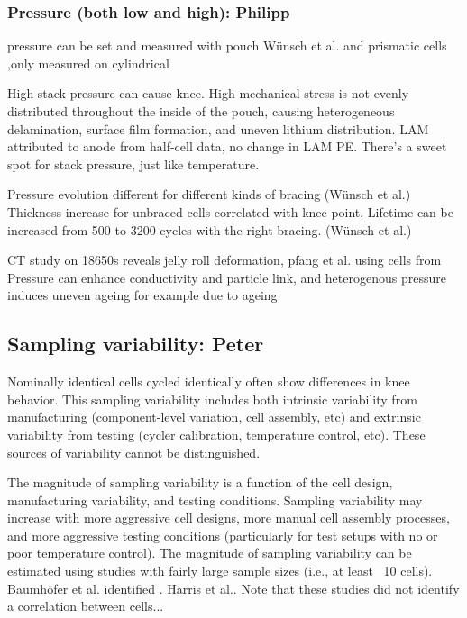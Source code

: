 \documentclass{article}
\begin{document}
\subsubsection{Pressure (both low and high): Philipp}

pressure can be set and measured with pouch Wünsch et al. and prismatic cells\cite{cannarella_stress_2014} ,only measured on cylindrical \cite{willenberg_high-precision_2020}

High stack pressure can cause knee. High mechanical stress is not evenly distributed throughout the inside of the pouch, causing heterogeneous delamination, surface film formation, and uneven lithium distribution. LAM attributed to anode from half-cell data, no change in LAM PE. There's a sweet spot for stack pressure, just like temperature.\cite{cannarella_stress_2014}

Pressure evolution different for different kinds of bracing (Wünsch et al.) Thickness increase for unbraced cells correlated with knee point. Lifetime can be increased from 500 to 3200 cycles with the right bracing. (Wünsch et al.)

CT study on 18650s reveals jelly roll deformation, pfang et al. \cite{pfrang_long-term_2018} using cells from 
Pressure can enhance conductivity and particle link, and 
heterogenous pressure induces uneven ageing for example due to ageing \cite{bach_nonlinear_2016}



\subsection{Sampling variability: Peter}

Nominally identical cells cycled identically often show differences in knee behavior. This sampling variability includes both intrinsic variability from manufacturing (component-level variation, cell assembly, etc) and extrinsic variability from testing (cycler calibration, temperature control, etc). These sources of variability cannot be distinguished.

The magnitude of sampling variability is a function of the cell design, manufacturing variability, and testing conditions. Sampling variability may increase with more aggressive cell designs, more manual cell assembly processes, and more aggressive testing conditions (particularly for test setups with no or poor temperature control). The magnitude of sampling variability can be estimated using studies with fairly large sample sizes (i.e., at least ~10 cells). Baumhöfer et al.\cite{baumhofer_production_2014} identified . Harris et al.\cite{harris_failure_2017}. Note that these studies did not identify a correlation between cells...
\end{document}
